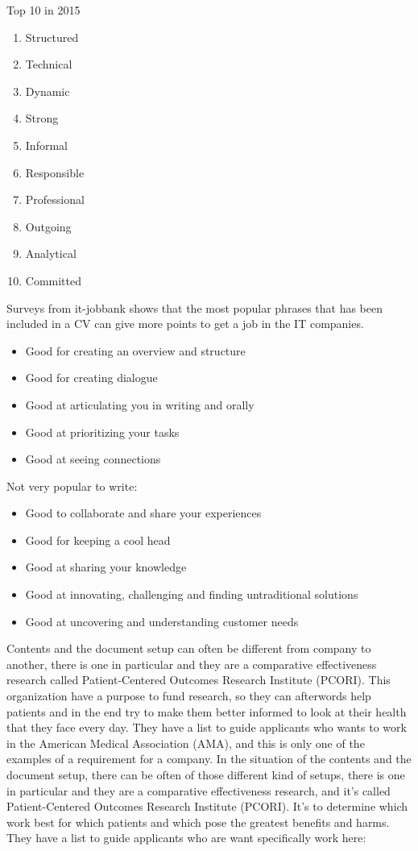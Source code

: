 Top 10 in 2015
\begin{enumerate}

\item Structured
\item Technical
\item Dynamic
\item Strong
\item Informal
\item Responsible
\item Professional
\item Outgoing
\item Analytical
\item Committed
\end{enumerate}

Surveys from it-jobbank shows that the most popular phrases
that has been included in a CV can give more points to get a job in the IT companies.
\begin{itemize}
\item Good for creating an overview and structure
\item Good for creating dialogue
\item Good at articulating you in writing and orally
\item Good at prioritizing your tasks
\item Good at seeing connections
\end{itemize}

Not very popular to write:
\begin{itemize}
\item Good to collaborate and share your experiences
\item Good for keeping a cool head
\item Good at sharing your knowledge
\item Good at innovating, challenging and finding untraditional solutions
\item Good at uncovering and understanding customer needs\cite{10_personal_skills}
\end{itemize}

Contents and the document setup can often be different from company to another,
there is one in particular and they are a comparative effectiveness research called
Patient-Centered Outcomes Research Institute (PCORI).
This organization have a purpose to fund research, so they can afterwords help patients and in the end try to make them better
informed to look at their health that they face every day.\cite{About_PCori}
They have a list to guide applicants who wants to work in the American Medical Association (AMA),
and this is only one of the examples of a requirement for a company.
In the situation of the contents and the document setup, there can be often of those different kind of setups,
there is one in particular and they are a comparative effectiveness research, and it's called
Patient-Centered Outcomes Research Institute (PCORI).
It's to determine which work best for which patients and which pose the greatest benefits and harms. %
They have a list to guide applicants who are want specifically work here:

